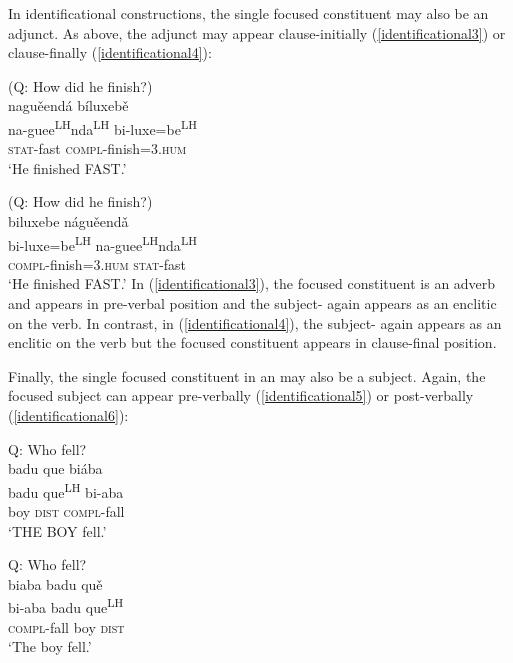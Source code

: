 In identificational constructions, the single focused constituent may also be an adjunct. As above, the adjunct may appear clause-initially (\ref{identificational3}) or clause-finally (\ref{identificational4}):

\ea\label{identificational3} 
(Q: How did he finish?) \\
\glll nagu\v{e}end\'{a} b\'{i}luxeb\v{e}  \\
na-guee\textsuperscript{LH}nda\textsuperscript{LH} bi-luxe=be\textsuperscript{LH}  \\
\textsc{stat}-fast \textsc{compl}-finish=\textsc{3.hum}  \\
\glt `He finished FAST.'
\z

\ea\label{identificational4} 
(Q: How did he finish?) \\
\glll biluxebe n\'{a}gu\v{e}end\v{a}  \\
bi-luxe=be\textsuperscript{LH} na-guee\textsuperscript{LH}nda\textsuperscript{LH}  \\
\textsc{compl}-finish=\textsc{3.hum} \textsc{stat}-fast   \\
\glt `He finished FAST.'
\z
In (\ref{identificational3}), the focused constituent is an adverb and appears in pre-verbal position and the subject- again appears as an enclitic on the verb. In contrast, in (\ref{identificational4}), the subject- again appears as an enclitic on the verb but the focused constituent appears in clause-final position. 

Finally, the single focused constituent in an  may also be a subject. Again, the focused subject can appear pre-verbally (\ref{identificational5}) or post-verbally (\ref{identificational6}): 

\ea\label{identificational5} 
{Q: Who fell?} \\
\glll badu que bi\'{a}ba \\
badu que\textsuperscript{LH} bi-aba  \\
boy \textsc{dist} \textsc{compl}-fall   \\
\glt `THE BOY fell.'
\z

\ea\label{identificational6}  
{Q: Who fell?} \\
\glll biaba badu qu\v{e}  \\
bi-aba badu que\textsuperscript{LH}  \\
\textsc{compl}-fall boy \textsc{dist}  \\
\glt `The boy fell.'
\z

